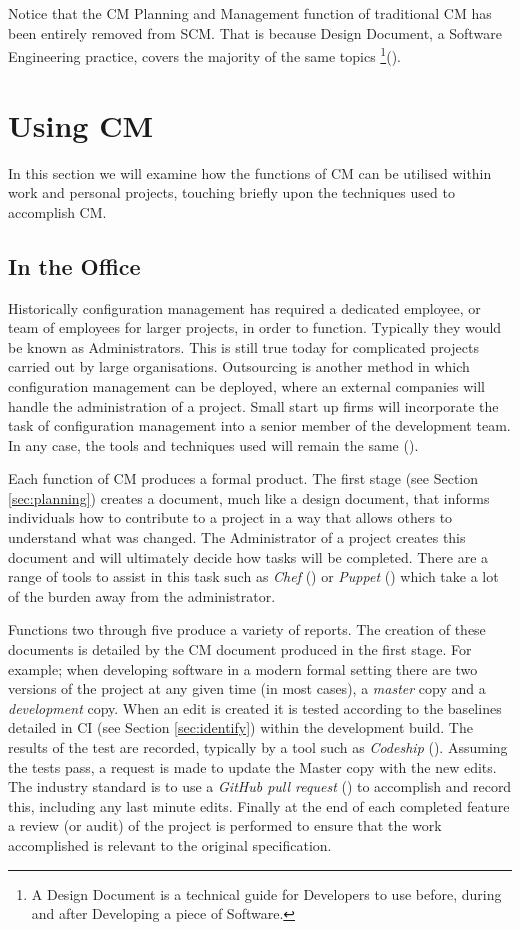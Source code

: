 \documentclass[cmpstyle]{ueacmpstyle}
\begin{document}
		Notice that the CM Planning and Management function of traditional CM has been entirely removed from SCM. That is because Design Document, a Software Engineering practice, covers the majority of the same topics \footnote{A Design Document is a technical guide for Developers to use before, during and after Developing a piece of Software.}(\cite{DesignDocExample}).
		
	\section{Using CM} \label{sec:using}
	In this section we will examine how the functions of CM can be utilised within work and personal projects, touching briefly upon the techniques used to accomplish CM. 
	
		\subsection{In the Office} \label{sec:office}
		Historically configuration management has required a dedicated employee, or team of employees for larger projects, in order to function. Typically they would be known as Administrators. This is still true today for complicated projects carried out by large organisations. Outsourcing is another method in which configuration management can be deployed, where an external companies will handle the administration of a project. Small start up firms will incorporate the task of configuration management into a senior member of the development team. In any case, the tools and techniques used will remain the same (\cite{CM-BestPractices}). 
		
		Each function of CM produces a formal product. The first stage (see Section \ref{sec:planning}) creates a document, much like a design document, that informs individuals how to contribute to a project in a way that allows others to understand what was changed. The Administrator of a project creates this document and will ultimately decide how tasks will be completed. There are a range of tools to assist in this task such as \emph{Chef} (\cite{chef}) or \emph{Puppet} (\cite{puppet}) which take a lot of the burden away from the administrator. 
		
		Functions two through five produce a variety of reports. The creation of these documents is detailed by the CM document produced in the first stage. For example; when developing software in a modern formal setting there are two versions of the project at any given time (in most cases), a \emph{master} copy and a \emph{development} copy. When an edit is created it is tested according to the baselines detailed in CI (see Section \ref{sec:identify}) within the development build. The results of the test are recorded, typically by a tool such as \emph{Codeship} (\cite{codeship}). Assuming the tests pass, a request is made to update the Master copy with the new edits. The industry standard is to use a \emph{GitHub pull request} (\cite{github}) to accomplish and record this, including any last minute edits. Finally at the end of each completed feature a review (or audit) of the project is performed to ensure that the work accomplished is relevant to the original specification. 
		
\end{document}
